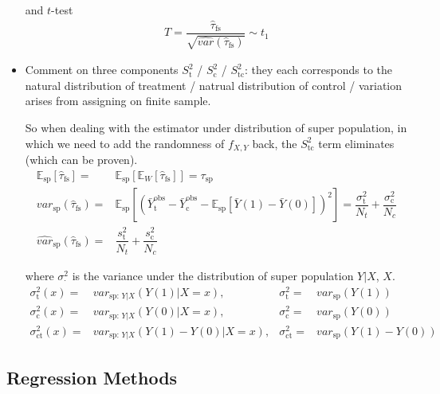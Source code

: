 \begin{itemize}[topsep=2pt,itemsep=0pt]
    and $ t $-test
    \begin{align}
        T=\dfrac{\hat{\tau}_\mathrm{fs}    }{\sqrt{\hat{var}(\hat{\tau}_\mathrm{fs} )}} \sim t_1
    \end{align}
    \item Comment on three components $ S^2_\mathrm{t}$ / $S^2_{\mathrm{c} }$ / $S^2_{\mathrm{tc} }  $: they each corresponds to the natural distribution of treatment / natrual distribution of control / variation arises from assigning on finite sample.
    
    So when dealing with the estimator under distribution of super population, in which we need to add the randomness of $ f_{X,Y} $ back, the $ S^2_\mathrm{tc}  $ term eliminates (which can be proven).
    \begin{align}
        \mathbb{E}_\mathrm{sp} \left[ \hat{\tau}_\mathrm{fs}  \right] = & \mathbb{E}_\mathrm{sp} \left[ \mathbb{E}_W \left[ \hat{\tau}_\mathrm{fs}  \right] \right] = \tau_\mathrm{sp}  \\
        var_\mathrm{sp} (\hat{\tau}_\mathrm{fs} )=&\mathbb{E}_\mathrm{sp} \left[( \bar{Y}_\mathrm{t} ^\mathrm{obs}-\bar{Y}_\mathrm{c}^\mathrm{obs}-\mathbb{E}_\mathrm{sp} \left[ \bar{Y}(1)-\bar{Y}(0) \right]    )^2 \right] = \dfrac{\sigma _\mathrm{t}^2 }{N_t}+\dfrac{\sigma _\mathrm{c}^2 }{N_c}\\
        \hat{var}_\mathrm{sp}(\hat{\tau}_\mathrm{fs} )=&\dfrac{s_\mathrm{t}^2 }{N_t}+\dfrac{s_\mathrm{c}^2 }{N_c} 
    \end{align}

    where $ \sigma ^2_\cdot $ is the variance under the distribution of super population $ Y|X $, $ X $.
    \begin{align}
         \sigma _\mathrm{t}^2(x)=&var_{\mathrm{sp}:\,Y|X}\left(Y(1)|X=x\right) ,& \sigma _\mathrm{t}^2=&var_\mathrm{sp}\left(Y(1)\right)\\
         \sigma _\mathrm{c}^2(x)=&var_{\mathrm{sp}:\,Y|X}\left(Y(0)|X=x\right) ,& \sigma _\mathrm{c}^2=&var_\mathrm{sp}\left(Y(0)\right)\\
         \sigma _\mathrm{ct}^2(x)=&var_{\mathrm{sp}:\,Y|X}\left(Y(1)-Y(0)|X=x\right) ,& \sigma _\mathrm{ct}^2=&var_\mathrm{sp}\left(Y(1)-Y(0)\right)
    \end{align}
    
    

    
\end{itemize}


\subsection{Regression Methods}


